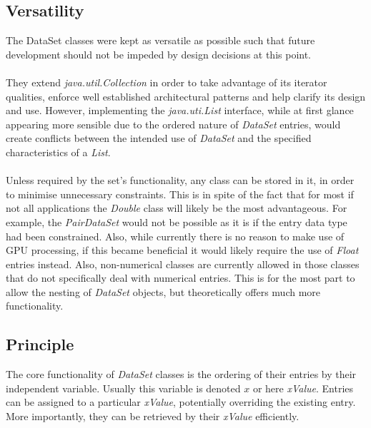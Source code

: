 \documentclass[main.tex]{subfiles}
\begin{document}
    \subsection{Versatility}
    
      The DataSet classes were kept as versatile as possible such that future development should not be impeded by design decisions at this point. 
      \\\\
      They extend \textit{java.util.Collection} in order to take advantage of its iterator qualities, enforce well established architectural patterns and help clarify its design and use. However, implementing the \textit{java.uti.List} interface, while at first glance appearing more sensible due to the ordered nature of \textit{DataSet} entries, would create conflicts between the intended use of  \textit{DataSet} and the specified characteristics of a \textit{List}.
      \\\\
      Unless required by the set's functionality, any class can be stored in it, in order to minimise unnecessary constraints. This is in spite of the fact that for most if not all applications the \textit{Double} class will likely be the most advantageous. For example, the \textit{PairDataSet} would not be possible as it is if the entry data type had been constrained. Also, while currently there is no reason to make use of GPU processing, if this became beneficial it would likely require the use of \textit{Float} entries instead. Also, non-numerical classes are currently allowed in those classes that do not specifically deal with numerical entries. This is for the most part to allow the nesting of \textit{DataSet} objects, but theoretically offers much more functionality.
    
    \subsection{Principle}
      \label{sec:impl:dataPrinciple}
      
      The core functionality of \textit{DataSet} classes is the ordering of their entries by their independent variable. Usually this variable is denoted $x$ or here \textit{xValue}. Entries can be assigned to a particular \textit{xValue}, potentially overriding the existing entry. More importantly, they can be retrieved by their \textit{xValue} efficiently. 
      
\end{document}
